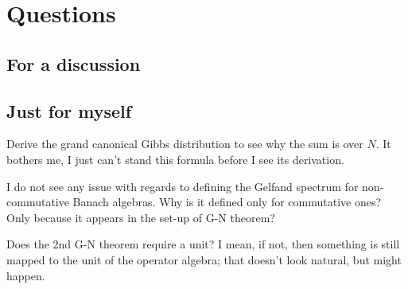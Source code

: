 \section{Questions}
\subsection{For a discussion}
\subsection{Just for myself}
\begin{quest}
Derive the grand canonical Gibbs distribution to see why the sum is over $N$. It bothers me, I just can't stand this formula before I see its derivation.
\end{quest}
\begin{quest}
I do not see any issue with regards to defining the Gelfand spectrum for non-commutative Banach algebras. Why is it defined only for commutative ones? Only because it appears in the set-up of G-N theorem?
\end{quest}
\begin{quest}
Does the 2nd G-N theorem require a unit? I mean, if not, then something is still mapped to the unit of the operator algebra; that doesn't look natural, but might happen.
\end{quest}